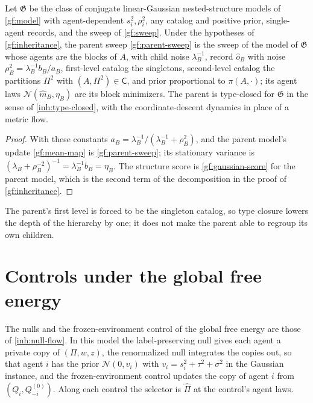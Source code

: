 Let $\mathfrak G$ be the class of conjugate linear-Gaussian nested-structure
models of \cref{gf:model} with agent-dependent $s_i^2,\rho_i^2$, any catalog
and positive prior, single-agent records, and the sweep of \cref{gf:sweep}.
Under the hypotheses of \cref{gf:inheritance}, the parent sweep
\cref{gf:parent-sweep} is the sweep of the model of $\mathfrak G$ whose agents
are the blocks of $A$, with child noise $\lambda_B^{-1}$, record
$\hat o_B$ with noise $\rho_B^2=\lambda_B^{-1}b_B/a_B$, first-level catalog
the singletons, second-level catalog the partitions $\Pi^2$ with
$(A,\Pi^2)\in\mathsf C$, and prior proportional to $\pi(A,\cdot)$; its agent
laws $\mathcal N(\hat m_B,\eta_B)$ are its block minimizers. The parent is
type-closed for $\mathfrak G$ in the sense of \cref{inh:type-closed}, with the
coordinate-descent dynamics in place of a metric flow.
\begin{proof}
With these constants $a_B=\lambda_B^{-1}/(\lambda_B^{-1}+\rho_B^2)$, and the
parent model's update \cref{gf:mean-map} is \cref{gf:parent-sweep}; its
stationary variance is $(\lambda_B+\rho_B^{-2})^{-1}=\lambda_B^{-1}b_B=\eta_B$.
The structure score is \cref{gf:gaussian-score} for the parent model, which
is the second term of the decomposition in the proof of
\cref{gf:inheritance}.
\end{proof}

The parent's first level is forced to be the singleton catalog, so type
closure lowers the depth of the hierarchy by one; it does not make the
parent able to regroup its own children.

\section{Controls under the global free energy}
\label{gf:sec-controls}

The nulls and the frozen-environment control of the global free energy are
those of \cref{inh:null-flow}. In this model the label-preserving null gives
each agent a private copy of $(\Pi,w,z)$, the renormalized null integrates the
copies out, so that agent $i$ has the prior $\mathcal N(0,v_i)$ with
$v_i=s_i^2+\tau^2+\sigma^2$ in the Gaussian instance, and the frozen-environment
control updates the copy of agent $i$ from $(Q_i,Q_{-i}^{(0)})$. Along each
control the selector is $\hat\Pi$ at the control's agent laws.

